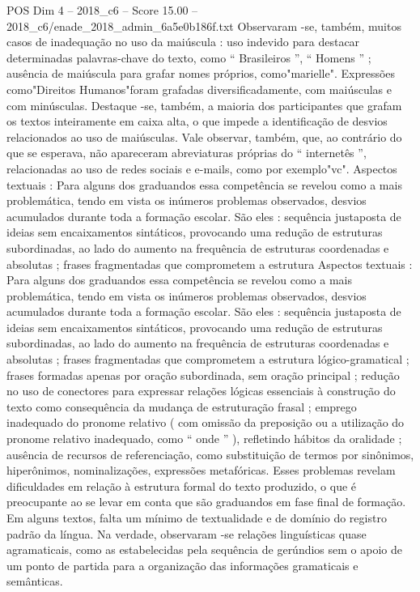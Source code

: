 \begin{textsample}{POS Dim 4 – 2018\_c6 – Score 15.00 – 2018\_c6/enade\_2018\_admin\_6a5e0b186f.txt}
Observaram -se, também, muitos casos de inadequação no uso da maiúscula : uso indevido para destacar determinadas palavras-chave do texto, como “ Brasileiros ”, “ Homens ” ; ausência de maiúscula para grafar nomes próprios, como"marielle".
Expressões como"Direitos Humanos"foram grafadas diversificadamente, com maiúsculas e com minúsculas.
Destaque -se, também, a maioria dos participantes que grafam os textos inteiramente em caixa alta, o que impede a identificação de desvios relacionados ao uso de maiúsculas.
Vale observar, também, que, ao contrário do que se esperava, não apareceram abreviaturas próprias do “ internetês ”, relacionadas ao uso de redes sociais e e-mails, como por exemplo"vc".
Aspectos textuais : Para alguns dos graduandos essa competência se revelou como a mais problemática, tendo em vista os inúmeros problemas observados, desvios acumulados durante toda a formação escolar.
São eles : sequência justaposta de ideias sem encaixamentos sintáticos, provocando uma redução de estruturas subordinadas, ao lado do aumento na frequência de estruturas coordenadas e absolutas ; frases fragmentadas que comprometem a estrutura Aspectos textuais : Para alguns dos graduandos essa competência se revelou como a mais problemática, tendo em vista os inúmeros problemas observados, desvios acumulados durante toda a formação escolar.
São eles : sequência justaposta de ideias sem encaixamentos sintáticos, provocando uma redução de estruturas subordinadas, ao lado do aumento na frequência de estruturas coordenadas e absolutas ; frases fragmentadas que comprometem a estrutura lógico-gramatical ; frases formadas apenas por oração subordinada, sem oração principal ; redução no uso de conectores para expressar relações lógicas essenciais à construção do texto como consequência da mudança de estruturação frasal ; emprego inadequado do pronome relativo ( com omissão da preposição ou a utilização do pronome relativo inadequado, como “ onde ” ), refletindo hábitos da oralidade ; ausência de recursos de referenciação, como substituição de termos por sinônimos, hiperônimos, nominalizações, expressões metafóricas.
Esses problemas revelam dificuldades em relação à estrutura formal do texto produzido, o que é preocupante ao se levar em conta que são graduandos em fase final de formação.
Em alguns textos, falta um mínimo de textualidade e de domínio do registro padrão da língua.
Na verdade, observaram -se relações linguísticas quase agramaticais, como as estabelecidas pela sequência de gerúndios sem o apoio de um ponto de partida para a organização das informações gramaticais e semânticas.

\end{textsample}
